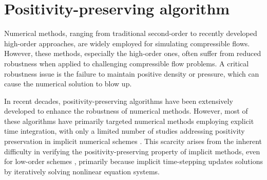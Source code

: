 
\begingroup
\color{r1color}

\section{Positivity-preserving algorithm}
\label{sec:PP}



Numerical methods, ranging from traditional second-order to recently developed high-order approaches, are widely employed for simulating compressible flows. However, these methods, especially the high-order ones, often suffer from reduced robustness when applied to challenging compressible flow problems. A critical robustness issue is the failure to maintain positive density or pressure, which can cause the numerical solution to blow up.



In recent decades, positivity-preserving algorithms have been extensively developed to enhance the robustness of numerical methods. However, most of these algorithms have primarily targeted numerical methods employing explicit time integration, with only a limited number of studies addressing positivity preservation in implicit numerical schemes \cite{qin2018implicit}. This scarcity arises from the inherent difficulty in verifying the positivity-preserving property of implicit methods, even for low-order schemes \cite{huang2024general}, primarily because implicit time-stepping updates solutions by iteratively solving nonlinear equation systems.


